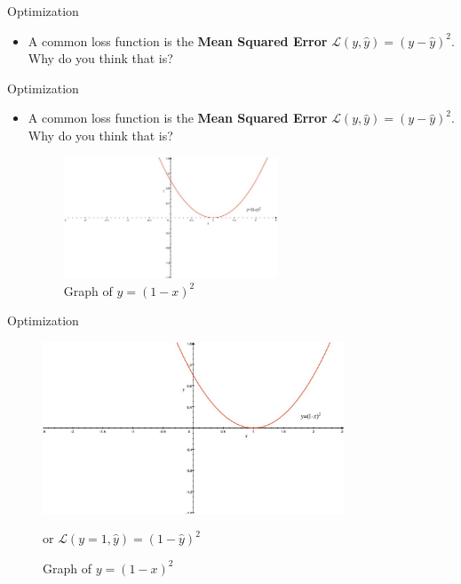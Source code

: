 \begin{frame}{Optimization}
\begin{itemize}
    \item A common loss function is the \textbf{Mean Squared Error} $\mathcal{L}(y, \hat{y}) = (y - \hat{y})^2$. Why do you think that is?
\end{itemize}
\end{frame}

\begin{frame}{Optimization}
\begin{itemize}
    \item A common loss function is the \textbf{Mean Squared Error} $\mathcal{L}(y, \hat{y}) = (y - \hat{y})^2$. Why do you think that is?
    \begin{figure}
    \centering
    \includegraphics[width=0.6\textwidth]{img/MSELoss.jpg}
    \caption{Graph of $y=(1-x)^2$}
    \end{figure}
\end{itemize}
\end{frame}

\begin{frame}{Optimization}
    \begin{figure}
    \centering
    \includegraphics[width=0.8\textwidth]{img/MSELoss.jpg}
    \caption{Graph of $y=(1-x)^2$} or $\mathcal{L}(y=1, \hat{y}) = (1-\hat{y})^2$
    \end{figure}
\end{frame}

